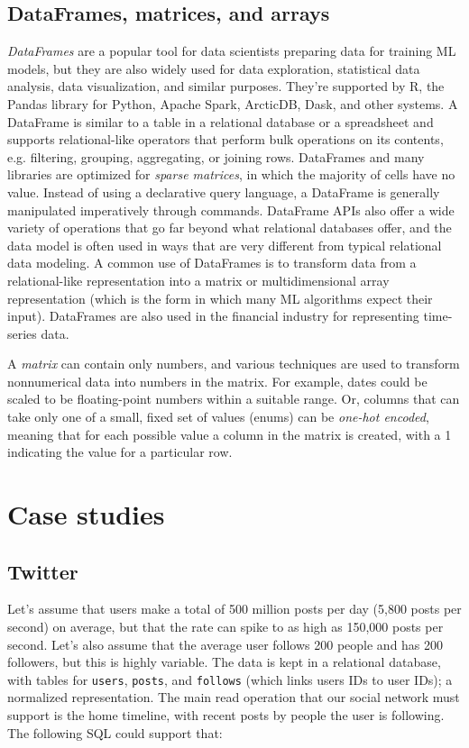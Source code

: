 \documentclass[table, xcdraw]{article}%
\begin{document}
\subsection{DataFrames, matrices, and arrays}

\textit{DataFrames} are a popular tool for data scientists preparing data for training ML models, but they are also widely used for data exploration, statistical data analysis, data visualization, and similar purposes. They're supported by R, the Pandas library
for Python, Apache Spark, ArcticDB, Dask, and other systems. A DataFrame is similar to a table in a relational database or a spreadsheet and supports relational-like operators that perform bulk operations on its contents, e.g. filtering, grouping, aggregating, or joining rows. DataFrames and many libraries are optimized for \textit{sparse matrices}, in which the majority of cells have no value. Instead of using a declarative query language, a DataFrame is generally manipulated imperatively through commands. DataFrame APIs also offer a wide variety of operations that go far beyond what relational databases offer, and the data model is often used in ways that are very different from typical relational data modeling. A common use of DataFrames is to transform data from a relational-like representation into a matrix or multidimensional array representation (which is the form in which many ML algorithms expect their input). DataFrames are also used in the financial industry for representing time-series data.

A \textit{matrix} can contain only numbers, and various techniques are used to transform nonnumerical data into numbers in the matrix. For example, dates could be scaled to be floating-point numbers within a suitable range. Or, columns that can take only one of a small, fixed set of values (enums) can be \textit{one-hot encoded}, meaning that for each possible value a column in the matrix is created, with a 1 indicating the value for a particular row.

\section{Case studies}

\subsection{Twitter}

Let’s assume that users make a total of 500 million posts per day (5,800 posts per second) on average, but that the rate can spike to as high as 150,000 posts per second. Let’s also assume that the average user follows 200 people and has 200 followers, but this is highly variable. The data is kept in a relational database, with tables for \texttt{users}, \texttt{posts}, and \texttt{follows} (which links users IDs to user IDs); a normalized representation. The main read operation that our social network must support is the home timeline, with recent posts by people the user is following. The following SQL could support that:
\end{document}
